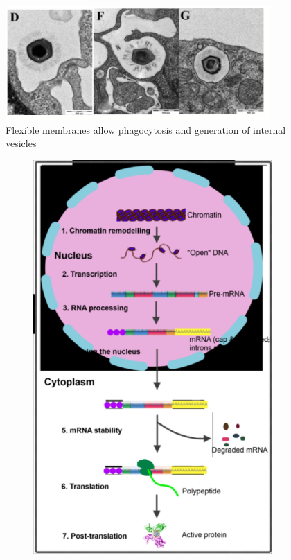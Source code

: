 \documentclass[]{article}
\begin{document}
\begin{figure}[H]
	\caption[Flexible membranes]{Flexible membranes allow phagocytosis and generation
		of internal vesicles}
	\label{fig:engulf}
	\includegraphics[width=0.9\textwidth]{Engulf}
\end{figure}

\begin{figure}[H]
	\caption[Nucleus and endomembrane system allow for finer gene
		regulation]{Nucleus and endomembrane system allow for finer gene
		regulation\cite{paez2016endocytosis}}\label{fig:finer:gene:regulation}
	\begin{subfigure}[b]{0.45\textwidth}
		\includegraphics[width=\textwidth]{Regulation1}

\end{subfigure}
\end{figure}
\end{document}
